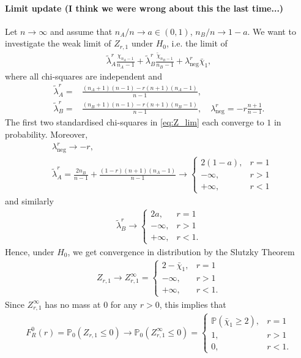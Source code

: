 \documentclass{article}
\theoremstyle{definition}
\theoremstyle{remark}
\renewcommand{\P}{\mathbb{P}}  %
\begin{document}
\paragraph{Limit update (I think we were wrong about this the last time...)}
Let $n \to \infty$ and assume that $n_A /n \to a \in (0, 1)$, $n_B/n \to 1 - a$. We want to investigate the weak limit of $Z_{r, 1}$ under $H_0$, i.e. the limit of
\begin{align}\label{eq:Z_lim}
	\tilde \lambda_A^r \frac{\chi_{n_A - 1}}{n_A - 1} + \tilde \lambda_B^r \frac{\tilde \chi_{n_B - 1}}{n_B - 1} + \lambda_{\text{neg}}^r \bar \chi_{1},
\end{align}
where all chi-squares are independent and
\begin{align*}
	\tilde \lambda_A^r = & \frac{(n_A + 1)(n-1) - r(n+1)(n_A-1)}{n-1},                                                    \\
	\tilde \lambda_B^r = & \frac{(n_B + 1)(n-1) - r(n+1)(n_B-1)}{n-1}, \quad \lambda_{\text{neg}}^r = -r \frac{n+1}{n-1}.
\end{align*}
The first two standardised chi-squares in \eqref{eq:Z_lim} each converge to $1$ in probability. Moreover,
\begin{align*}
	 & \lambda_{\text{neg}}^r \to - r,                                          \\
	 & \tilde \lambda_A^r = \frac{2 n_B}{n-1} + \frac{(1-r)(n+1)(n_A - 1)}{n-1}
	\to
	\begin{cases}
		2(1-a),   & r=1  \\
		- \infty, & r >1 \\
		+ \infty, & r <1
	\end{cases}
\end{align*}
and similarly
\begin{align*}
	\tilde \lambda_B^r
	\to
	\begin{cases}
		2a,       & r=1   \\
		- \infty, & r >1  \\
		+ \infty, & r <1.
	\end{cases}
\end{align*}
Hence, under $H_0$, we get convergence in distribution by the Slutzky Theorem
\begin{align*}
	Z_{r, 1} \to Z_{r, 1}^\infty =
	\begin{cases}
		2 - \bar \chi_{1}, & r=1   \\
		- \infty,          & r >1  \\
		+ \infty,          & r <1.
	\end{cases}
\end{align*}
Since $Z_{r, 1}^\infty$ has no mass at $0$ for any $r > 0$, this implies that
\begin{align*}
	F_R^0(r) = \P_0(Z_{r, 1} \leq 0) \to \P_0(Z_{r, 1}^{\infty} \leq 0) =
	\begin{cases}
		\P(\bar \chi_{1} \geq 2), & r=1   \\
		1,                        & r >1  \\
		0,                        & r <1.
	\end{cases}
\end{align*}
\end{document}
